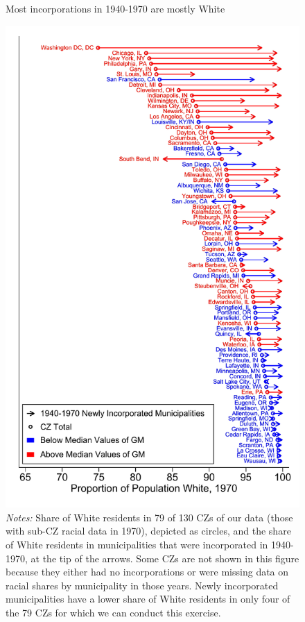 \documentclass{article}
\begin{document}
\begin{figure}
    \centering
    \caption{Most incorporations in 1940-1970 are mostly White}\label{fig:pcarrow_figure}
    \includegraphics[width = .55\textwidth]{figures/pcarrow_figure_GM_hat.pdf}
    \caption*{\scriptsize \emph{Notes:} Share of White residents in 79 of 130 CZs of our data (those with sub-CZ racial data in 1970), depicted as circles, and the share of White residents in municipalities that were incorporated in 1940-1970, at the tip of the arrows. Some CZs are not shown in this figure because they either had no incorporations or were missing data on racial shares by municipality in those years. Newly incorporated municipalities have a lower share of White residents in only four of the 79 CZs for which we can conduct this exercise.}
\end{figure}

\clearpage
\end{document}
